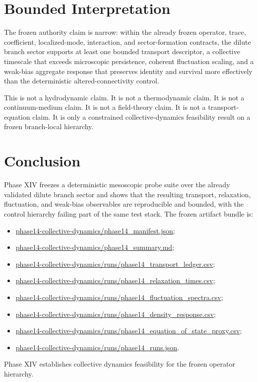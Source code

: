 \documentclass[11pt]{article}
\begin{document}
\section{Bounded Interpretation}

The frozen authority claim is narrow: within the already frozen operator, trace, coefficient, localized-mode, interaction, and sector-formation contracts, the dilute branch sector supports at least one bounded transport descriptor, a collective timescale that exceeds microscopic persistence, coherent fluctuation scaling, and a weak-bias aggregate response that preserves identity and survival more effectively than the deterministic altered-connectivity control.

This is not a hydrodynamic claim. It is not a thermodynamic claim. It is not a continuum-medium claim. It is not a field-theory claim. It is not a transport-equation claim. It is only a constrained collective-dynamics feasibility result on a frozen branch-local hierarchy.

\section{Conclusion}

Phase XIV freezes a deterministic mesoscopic probe suite over the already validated dilute branch sector and shows that the resulting transport, relaxation, fluctuation, and weak-bias observables are reproducible and bounded, with the control hierarchy failing part of the same test stack. The frozen artifact bundle is:
\begin{itemize}
\item \url{phase14-collective-dynamics/phase14_manifest.json};
\item \url{phase14-collective-dynamics/phase14_summary.md};
\item \url{phase14-collective-dynamics/runs/phase14_transport_ledger.csv};
\item \url{phase14-collective-dynamics/runs/phase14_relaxation_times.csv};
\item \url{phase14-collective-dynamics/runs/phase14_fluctuation_spectra.csv};
\item \url{phase14-collective-dynamics/runs/phase14_density_response.csv};
\item \url{phase14-collective-dynamics/runs/phase14_equation_of_state_proxy.csv};
\item \url{phase14-collective-dynamics/runs/phase14_runs.json}.
\end{itemize}

Phase XIV establishes collective dynamics feasibility for the frozen operator hierarchy.
\end{document}
